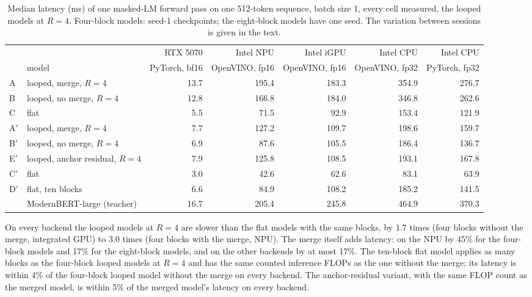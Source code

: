 \documentclass[11pt]{article}
\begin{document}
\begin{table}[t]
\centering
\small
\begin{adjustbox}{max width=\linewidth}
\begin{tabular}{llrrrrr}
\toprule
& & RTX 5070 & Intel NPU & Intel iGPU & Intel CPU & Intel CPU \\
& model & PyTorch, bf16 & OpenVINO, fp16 & OpenVINO, fp16 & OpenVINO, fp32 & PyTorch, fp32 \\
\midrule
A & looped, merge, $R = 4$ & 13.7 & 195.4 & 183.3 & 354.9 & 276.7 \\
B & looped, no merge, $R = 4$ & 12.8 & 166.8 & 184.0 & 346.8 & 262.6 \\
C & flat & 5.5 & 71.5 & 92.9 & 153.4 & 121.9 \\
\midrule
A$'$ & looped, merge, $R = 4$ & 7.7 & 127.2 & 109.7 & 198.6 & 159.7 \\
B$'$ & looped, no merge, $R = 4$ & 6.9 & 87.6 & 105.5 & 186.4 & 136.7 \\
E$'$ & looped, anchor residual, $R = 4$ & 7.9 & 125.8 & 108.5 & 193.1 & 167.8 \\
C$'$ & flat & 3.0 & 42.6 & 62.6 & 83.1 & 63.9 \\
D$'$ & flat, ten blocks & 6.6 & 84.9 & 108.2 & 185.2 & 141.5 \\
\midrule
& ModernBERT-large (teacher) & 16.7 & 205.4 & 245.8 & 464.9 & 370.3 \\
\bottomrule
\end{tabular}
\end{adjustbox}
\caption{Median latency (ms) of one masked-LM forward pass on one 512-token sequence, batch size 1, every cell measured, the looped models at
$R = 4$. Four-block models: seed-1 checkpoints; the eight-block models have one seed. The variation between sessions is given in the text.}
\label{tab:latency}
\end{table}

On every backend the looped models at $R = 4$ are slower than the flat models with the same blocks, by 1.7 times (four blocks without the
merge, integrated GPU) to 3.0 times (four blocks with the merge, NPU). The merge itself adds latency: on the NPU by 45\% for the four-block models
and 17\% for the eight-block models, and on the other backends by at most 17\%. The ten-block flat model applies as many blocks as the
four-block looped models at $R = 4$ and has the same counted inference FLOPs as the one without the merge; its latency is within 4\% of the
four-block looped model without the merge on every backend. The anchor-residual variant, with the same FLOP count as the merged model, is within
5\% of the merged model's latency on every backend.
\end{document}
